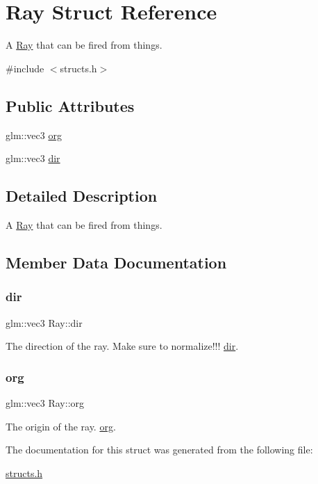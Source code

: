 \hypertarget{struct_ray}{}\section{Ray Struct Reference}
\label{struct_ray}


A \mbox{\hyperlink{struct_ray}{Ray}} that can be fired from things.  




{\ttfamily \#include $<$structs.\+h$>$}

\subsection*{Public Attributes}
\begin{DoxyCompactItemize}
\item 
glm\+::vec3 \mbox{\hyperlink{struct_ray_a37337cf8775a751e2d58de86ffccebec}{org}}
\item 
glm\+::vec3 \mbox{\hyperlink{struct_ray_a666e66ac32a5462ae95161a361e91951}{dir}}
\end{DoxyCompactItemize}


\subsection{Detailed Description}
A \mbox{\hyperlink{struct_ray}{Ray}} that can be fired from things. 

\subsection{Member Data Documentation}
\mbox{\label{struct_ray_a666e66ac32a5462ae95161a361e91951}} 
\subsubsection{\texorpdfstring{dir}{dir}}
{\footnotesize\ttfamily glm\+::vec3 Ray\+::dir}

The direction of the ray. Make sure to normalize!!! \mbox{\hyperlink{struct_ray_a666e66ac32a5462ae95161a361e91951}{dir}}. \mbox{\label{struct_ray_a37337cf8775a751e2d58de86ffccebec}} 
\subsubsection{\texorpdfstring{org}{org}}
{\footnotesize\ttfamily glm\+::vec3 Ray\+::org}

The origin of the ray. \mbox{\hyperlink{struct_ray_a37337cf8775a751e2d58de86ffccebec}{org}}. 

The documentation for this struct was generated from the following file\+:\begin{DoxyCompactItemize}
\item 
\mbox{\hyperlink{structs_8h}{structs.\+h}}\end{DoxyCompactItemize}
